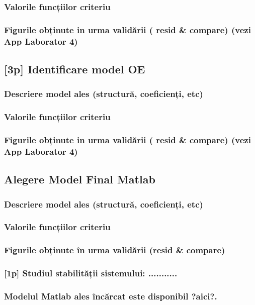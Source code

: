 \documentclass[12pt,english]{article}
\begin{document}
\subsubsection { Valorile funcțiilor criteriu }
\subsubsection { Figurile obținute in urma validării ( resid \& compare) (vezi App Laborator 4) }
\subsection { [3p] Identificare model OE }
\subsubsection { Descriere model ales (structură, coeficienți, etc) }
\subsubsection { Valorile funcțiilor criteriu }
\subsubsection { Figurile obținute in urma validării ( resid \& compare) (vezi App Laborator 4) }
\subsection { Alegere Model Final Matlab }
\subsubsection { Descriere model ales (structură, coeficienți, etc) }
\subsubsection { Valorile funcțiilor criteriu }
\subsubsection { Figurile obținute în urma validării (resid \& compare) }
\subsubsection { [1p] Studiul stabilității sistemului: ........... }
\subsubsection { Modelul Matlab ales încărcat este disponibil ?aici?. }
\end{document}
